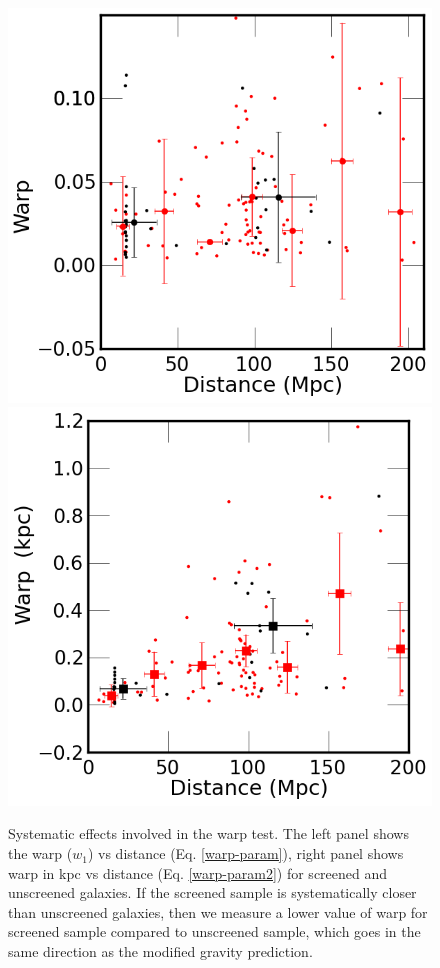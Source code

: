 \documentclass{emulateapj}
\begin{document}
\begin{figure}
\begin{center}
  \includegraphics[scale=0.37]{figures/distance-vs-warpness.png}
  \includegraphics[scale=0.37]{figures/distance-vs-warp-kpc.png}
  \caption{Systematic effects involved in the warp test. The left panel shows the
warp ($w_1$) vs distance (Eq. \ref{warp-param}), right panel shows
warp in kpc vs  distance (Eq. \ref{warp-param2}) for screened and
unscreened galaxies. If the screened sample is systematically
closer than unscreened galaxies, then we measure a lower value of warp for
screened sample compared to unscreened sample, which goes in the same direction
as the modified gravity prediction.}
\label{warp-syst}
\end{center}
\end{figure}
\end{document}

